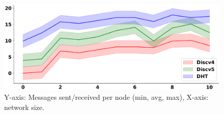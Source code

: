 %
%
%
%

\iffalse
\begin{figure}[!h]
\includegraphics[width=\linewidth]{img/placeholder_max_min}
\caption{Y-axis: Messages sent/received per node (min, avg, max), X-axis: network size.} 
\label{fig:efficiency_messages_size}
\end{figure}

